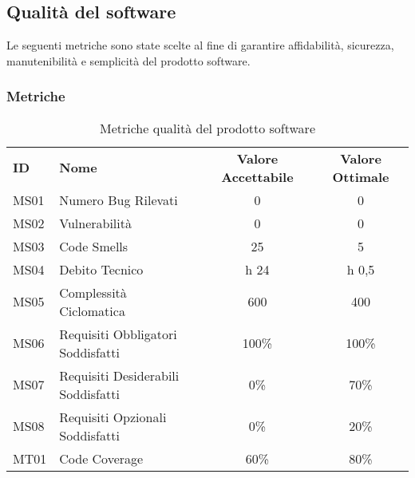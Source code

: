 \subsection{Qualità del software}
Le seguenti metriche sono state scelte al fine di garantire affidabilità, sicurezza, manutenibilità e semplicità del prodotto software.

    \subsubsection{Metriche}
    \begin{table} [h!]
        \begin{center}
            \begin{tabular} {m{2 cm} m{7 cm} c c }
                \rowcolor{lightgray}
                \textbf{ID} & \textbf{Nome}           & \textbf{Valore Accettabile} & \textbf{Valore Ottimale}\\
                MS01        & Numero Bug Rilevati     & 0                           & 0\\
                MS02        & Vulnerabilità           & 0                           & 0\\
                MS03        & Code Smells             & 25                          & 5\\
                MS04        & Debito Tecnico          & h 24                        & h 0,5\\
              MS05        & Complessità Ciclomatica &
               600                         & 400\\
               MS06        & Requisiti Obbligatori Soddisfatti & 100\%             & 100\%\\
               MS07        & Requisiti Desiderabili Soddisfatti & 0\%              & 70\%\\
               MS08        & Requisiti Opzionali Soddisfatti & 0\%                 & 20\%\\
                MT01        & Code Coverage           & 60\%                        & 80\%\\
              
                
            \end{tabular}
            \caption{Metriche qualità del prodotto software}
        \end{center}
    \end{table}